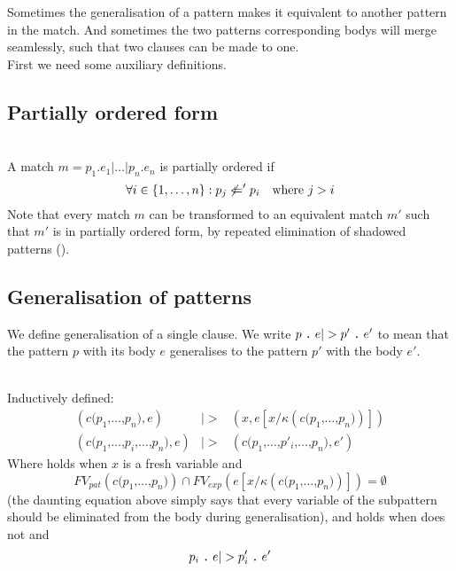 Sometimes the generalisation of a pattern makes it equivalent to another pattern
in the match. And sometimes the two patterns corresponding bodys will merge
seamlessly, such that two clauses can be made to one.
\\[1em]
First we need some auxiliary definitions.

\subsection{Partially ordered form}
\begin{definition}\ \\
  \label{def:part-order-form}
  A match $m = p_1\texttt{.}e_1\texttt{|}\ldots\texttt{|}p_n\texttt{.}e_n$ is
  partially ordered if
  \[
  \forall i \in \{1, \ldots, n\} : p_j \not <=' p_i \quad \textnormal{where $j > i$}
  \]
  Note that every match $m$ can be transformed to an equivalent match $m'$ such
  that $m'$ is in partially ordered form, by repeated elimination of shadowed
  patterns ().
\end{definition}

\subsection{Generalisation of patterns}
We define generalisation of a single clause. We write $\clause{p}{e} |>
\clause{p'}{e'}$ to mean that the pattern $p$ with its body $e$ generalises to
the pattern $p'$ with the body $e'$.

\begin{definition}\ \\
  \label{def:gener-patt}
  Inductively defined:
  \begin{eqnarray}
    (c \texttt{(} p_1 \texttt{,} \ldots \texttt{,} p_n \texttt{)} , e) &|>& (x , e[x
    / \kappa (c \texttt{(} p_1 \texttt{,} \ldots \texttt{,} p_n \texttt{)} )]) 
    \label{eq:single-gen-1}\\
    (c \texttt{(} p_1 \texttt{,} \ldots \texttt{,} p_i \texttt{,} \ldots
    \texttt{,} p_n \texttt{)}, e) &|>&
    (c \texttt{(} p_1 \texttt{,} \ldots \texttt{,} p'_i \texttt{,} \ldots
    \texttt{,} p_n \texttt{)}, e') \label{eq:single-gen-2}
  \end{eqnarray}
  Where  holds when $x$ is a fresh variable and
  \[
  FV_{pat}(c\texttt{(}p_1\texttt{,}\ldots\texttt{,}p_n\texttt{)}) \cap FV_{exp}(e[x/\kappa
  (c\texttt{(}p_1\texttt{,}\ldots\texttt{,}p_n\texttt{)})]) = \emptyset
  \]
  (the daunting equation above simply says that every variable of the subpattern
  should be eliminated from the body during generalisation), and
   holds when  does not and
  \[
  \clause{p_i}{e} |> \clause{p'_i}{e'}
  \]
\end{definition}

